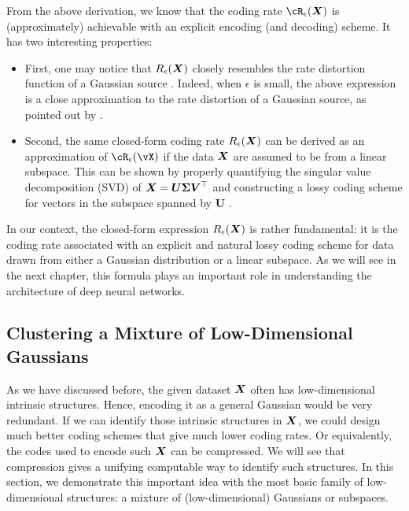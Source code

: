 \documentclass[../../book-main.tex]{subfiles}
\begin{document}
From the above derivation, we know that the coding rate $\cR_{\epsilon}(\X)$ is (approximately) achievable with an explicit encoding (and decoding) scheme. It has two interesting  properties:
\begin{itemize}
	\item First, one may notice that $R_{\epsilon}(\bm{X})$ closely resembles the rate distortion function of a Gaussian source \cite{Cover-Thomas}. Indeed, when $\epsilon$ is small, the above expression is a close approximation to the rate distortion of a Gaussian source, as pointed out by   \cite{MaY2007-PAMI}.
	\item Second, the same closed-form coding rate $R_{\epsilon}(\bm{X})$ can be derived as an approximation of \(\cR_{\epsilon}(\vX)\) if the data $\bm{X}$ are assumed to be from a linear subspace. This can be shown by properly quantifying the singular value decomposition (SVD) of $\bm{X} = \boldsymbol{U} \boldsymbol{\Sigma}\boldsymbol{V}^\top$ and constructing a lossy coding scheme for vectors in the subspace spanned by $\boldsymbol{U}$ \cite{MaY2007-PAMI}.
\end{itemize}
In our context, the closed-form expression $R_{\epsilon}(\bm{X})$ is rather fundamental: it is the coding rate associated with an explicit and natural lossy coding scheme for data drawn from either a Gaussian distribution or a linear subspace. As we will see in the next chapter, this formula plays an important role in understanding the architecture of deep neural networks.


\subsection{Clustering a Mixture of Low-Dimensional Gaussians}
\label{sec:clustering-Gaussians}
As we have discussed before, the given dataset $\bm{X}$ often has low-dimensional intrinsic structures. Hence, encoding it as a general Gaussian would be very redundant. If we can identify those intrinsic structures in $\bm{X}$, we could design much better coding schemes that give much lower coding rates. Or equivalently, the codes used to encode such $\bm{X}$ can be compressed. We will see that compression gives a unifying computable way to identify such structures. In this section, we demonstrate this important idea with the most basic family of low-dimensional structures: a mixture of (low-dimensional) Gaussians or subspaces.
\end{document}
